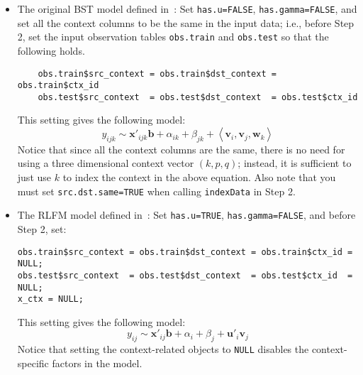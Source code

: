\documentclass[10pt]{article}
\begin{document}
\begin{itemize}
\item The original BST model defined in~\cite{bst:kdd11}: Set {\tt has.u=FALSE}, {\tt has.gamma=FALSE}, and set all the context columns to be the same in the input data; i.e., before Step 2, set the input observation tables {\tt obs.train} and {\tt obs.test} so that the following holds.
{\small\begin{verbatim}
    obs.train$src_context = obs.train$dst_context = obs.train$ctx_id
    obs.test$src_context  = obs.test$dst_context  = obs.test$ctx_id
\end{verbatim}}
This setting gives the following model:
$$
y_{ijk} \sim \bm{x}'_{ijk} \bm{b} + \alpha_{ik} + \beta_{jk} + \left<\bm{v}_i, \bm{v}_j, \bm{w}_k\right>
$$
Notice that since all the context columns are the same, there is no need for using a three dimensional context vector $(k,p,q)$; instead, it is sufficient to just use $k$ to index the context in the above equation.  Also note that you must set {\tt src.dst.same=TRUE} when calling {\tt indexData} in Step 2.
\item The RLFM model defined in~\cite{rlfm:kdd09}: Set {\tt has.u=TRUE}, {\tt has.gamma=FALSE}, and before Step 2, set:
{\small\begin{verbatim}
obs.train$src_context = obs.train$dst_context = obs.train$ctx_id = NULL;
obs.test$src_context  = obs.test$dst_context  = obs.test$ctx_id  = NULL;
x_ctx = NULL;
\end{verbatim}}
This setting gives the following model:
$$
y_{ij} \sim \bm{x}'_{ij} \bm{b} + \alpha_{i} + \beta_{j} + \bm{u}'_i \bm{v}_j
$$
Notice that setting the context-related objects to {\tt NULL} disables the context-specific factors in the model.
\end{itemize}
\end{document}
